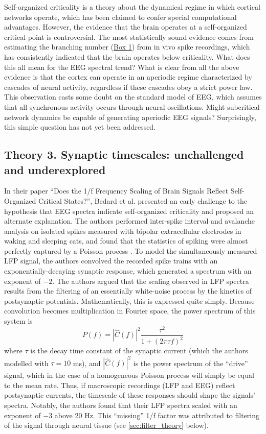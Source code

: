 Self-organized criticality is a theory about the dynamical regime in which cortical networks operate, which has been claimed to confer special computational advantages. However, the evidence that the brain operates at a self-organized critical point is controversial. The most statistically sound evidence comes from estimating the branching number (\hyperref[box:first]{Box 1}) from in vivo spike recordings, which has consistently indicated that the brain operates below criticality. What does this all mean for the EEG spectral trend? What is clear from all the above evidence is that the cortex can operate in an aperiodic regime characterized by cascades of neural activity, regardless if these cascades obey a strict power law. This observation casts some doubt on the standard model of EEG, which assumes that all synchronous activity occurs through neural oscillations. Might subcritical network dynamics be capable of generating aperiodic EEG signals? Surprisingly, this simple question has not yet been addressed.

\subsection{Theory 3. Synaptic timescales: unchallenged and underexplored} \label{sec:timescales}

In their paper ``Does the 1/f Frequency Scaling of Brain Signals Reflect Self-Organized Critical States?'', Bedard et al.\cite{Bedard2006} presented an early challenge to the hypothesis that EEG spectra indicate self-organized criticality and proposed an alternate explanation. The authors performed inter-spike interval and avalanche analysis on isolated spikes measured with bipolar extracellular electrodes in waking and sleeping cats, and found that the statistics of spiking were almost perfectly captured by a Poisson process \cite{Bedard2006}. To model the simultaneously measured LFP signal, the authors convolved the recorded spike trains with an exponentially-decaying synaptic response, which generated a spectrum with an exponent of $-2$. The authors argued that the scaling observed in LFP spectra results from the filtering of an essentially white-noise process by the kinetics of postsynaptic potentials. Mathematically, this is expressed quite simply. Because convolution becomes multiplication in Fourier space, the power spectrum of this system is
\begin{equation}
P(f) =|\hat{C}(f)|^2 \frac{\tau^2} { 1+ (2\pi\tau f)^2}
\end{equation}
where $\tau$ is the decay time constant of the synaptic current (which the authors modelled with $\tau=10$ \unit{\milli\second}), and $|\hat{C}(f)|^2$ is the power spectrum of the ``drive'' signal, which in the case of a homogeneous Poisson process will simply be equal to the mean rate. Thus, if macroscopic recordings (LFP and EEG) reflect postsynaptic currents, the timescale of these responses should shape the signals' spectra. Notably, the authors found that their LFP spectra scaled with an exponent of $-3$ above 20 Hz. This ``missing'' 1/f factor was attributed to filtering of the signal through neural tissue (see \autoref{sec:filter_theory} below).

